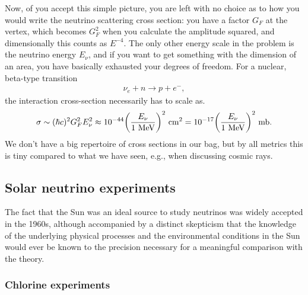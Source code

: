 Now, of you accept this simple picture, you are left with no choice as to how you
would write the neutrino scattering cross section: you have a factor $G_F$ at the
vertex, which becomes $G_F^2$ when you calculate the amplitude squared, and
dimensionally this counts as $E^{-4}$. The only other energy scale in the problem
is the neutrino energy $E_\nu$, and if you want to get something with the
dimension of an area, you have basically exhausted your degrees of
freedom. For a nuclear, beta-type transition
\begin{align}\label{eq:nu_nuclear_transition}
  \nu_e + n \rightarrow p + e^-,
\end{align}
the interaction cross-section necessarily has to scale as.
\begin{align*}
  \sigma \sim (\hbar c)^2 G_F^2 E_\nu^2
  \approx 10^{-44} \qty(\frac{E_\nu}{1~\text{MeV}})^2~\text{cm}^2 =
  10^{-17} \qty(\frac{E_\nu}{1~\text{MeV}})^2~\text{mb}.
\end{align*}
We don't have a big repertoire of cross sections in our bag, but by all metrics this
is tiny compared to what we have seen, e.g., when discussing cosmic rays.


\subsection{Solar neutrino experiments}

The fact that the Sun was an ideal source to study neutrinos was widely accepted in
the 1960s, although accompanied by a distinct skepticism that the knowledge of the
underlying physical processes and the environmental conditions in the Sun would
ever be known to the precision necessary for a meaningful comparison with the theory.

\subsubsection{Chlorine experiments}

